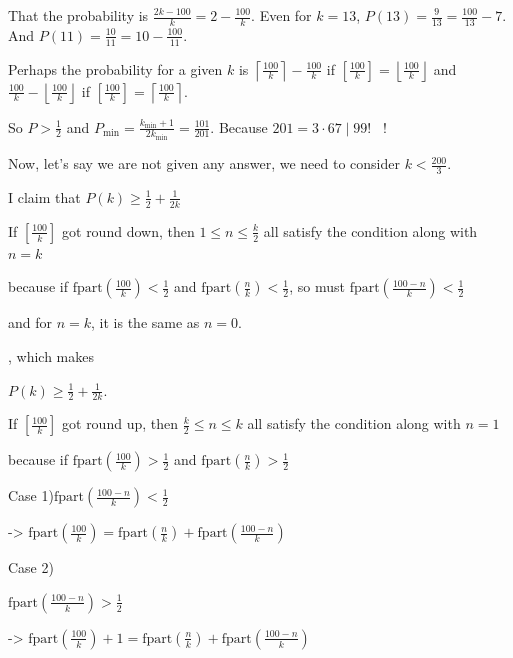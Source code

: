\begin{enumerate}
 
That the probability is $\frac{2k-100}{k}=2-\frac{100}{k}$. Even for $k=13$, $P(13)=\frac{9}{13}=\frac{100}{13}-7$. And $P(11)=\frac{10}{11}=10-\frac{100}{11}$.

 Perhaps the probability for a given $k$ is $\left\lceil{\frac{100}{k}}\right\rceil-\frac{100}{k}$ if $\left[\frac{100}{k}\right]=\left\lfloor{\frac{100}{k}}\right\rfloor$ and $\frac{100}{k}-\left\lfloor{\frac{100}{k}}\right\rfloor$ if $\left[\frac{100}{k}\right]=\left\lceil{\frac{100}{k}}\right\rceil$.

 So $P>\frac{1}{2}$ and $P_\text{min}=\frac{k_\text{min}+1}{2k_\text{min}}=\frac{101}{201}$. Because $201=3\cdot 67\mid 99!$  !

 


 


 Now, let's say we are not given any answer, we need to consider $k < \frac{200}{3}$.

 I claim that $P(k) \ge \frac{1}{2} + \frac{1}{2k}$

 
If $\left[\frac{100}{k}\right]$ got round down, then $1 \le n \le \frac{k}{2}$ all satisfy the condition along with $n = k$

 because if $\text{fpart}\left(\frac{100}{k}\right) < \frac{1}{2}$ and $\text{fpart} \left(\frac{n}{k}\right) < \frac{1}{2}$, so must $\text{fpart} \left(\frac{100 - n}{k}\right) < \frac{1}{2}$

 and for $n = k$, it is the same as $n = 0$.

 , which makes 

 $P(k) \ge \frac{1}{2} + \frac{1}{2k}$.

 
If $\left[\frac{100}{k}\right]$ got round up, then $\frac{k}{2} \le n \le k$ all satisfy the condition along with $n = 1$

 
because if $\text{fpart}\left(\frac{100}{k}\right) > \frac{1}{2}$ and $\text{fpart} \left(\frac{n}{k}\right) > \frac{1}{2}$

 Case 1)$\text{fpart} \left(\frac{100 - n}{k}\right) < \frac{1}{2}$ 

 -> $\text{fpart}\left(\frac{100}{k}\right) = \text{fpart} \left(\frac{n}{k}\right) +\text{fpart} \left(\frac{100 - n}{k}\right)$ 

 Case 2)

 $\text{fpart} \left(\frac{100 - n}{k}\right) > \frac{1}{2}$ 

 -> $\text{fpart}\left(\frac{100}{k}\right) + 1 = \text{fpart} \left(\frac{n}{k}\right) +\text{fpart} \left(\frac{100 - n}{k}\right)$ 


\end{enumerate}
